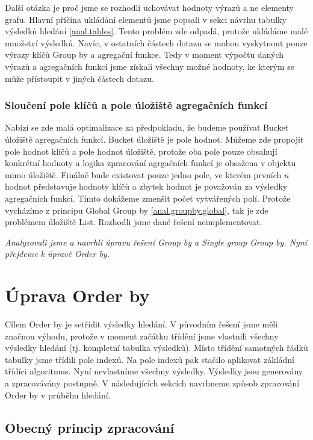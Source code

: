 Další otázka je proč jsme se rozhodli uchovávat hodnoty výrazů a ne elementy grafu.
Hlavní příčina ukládání elementů jsme popsali v sekci návrhu tabulky výsledků hledání \ref{anal.tables}.
Tento problém zde odpadá, protože ukládáme malé množství výsledků.
Navíc, v ostatních částech dotazu se mohou vyskytnout pouze výrazy klíčů Group by a agregační funkce.
Tedy v moment výpočtu daných výrazů a agregačních funkcí jsme získali všechny možné hodnoty, ke kterým se může přístoupit v jiných částech dotazu. 

\subsubsection{Sloučení pole klíčů a pole úložiště agregačních funkcí}

Nabízí se zde malá optimalizace za předpokladu, že budeme používat Bucket úložiště agregačních funkcí.
Bucket úložiště je pole hodnot.
Můžeme zde propojit pole hodnot klíčů a pole hodnot úložiště, protože oba pole pouze obsahují konkrétní hodnoty a logika zpracování agrgačních funkcí je obsažena v objektu mimo úložiště.
Finálně bude existovat pouze jedno pole, ve kterém prvních $n$ hodnot představuje hodnoty klíčů a zbytek hodnot je považován za výsledky agregačních funkcí.
Tímto dokážeme zmenšit počet vytvářených polí.
Protože vycházíme z principu Global Group by \ref{anal.groupby.global}, tak je zde problémem úložiště List.
Rozhodli jsme dané řešení neimplementovat.

\bigskip
\textit{Analyzovali jsme a navrhli úpravu řešení Group by a Single group Group by. 
Nyní přejdeme k úpravě Order by.}

\section{Úprava Order by}

Cílem Order by je setřídit výsledky hledání.
V původním řešení jsme měli značnou výhodu, protože v moment začátku třídění jsme vlastnili všechny výsledky hledání (tj. kompletní tabulka výsledků).
Místo třídění samotných řádků tabulky jsme třídili pole indexů.
Na pole indexů pak stačilo aplikovat zákládní třídíci algoritmus.
Nyní nevlastníme všechny výsledky.
Výsledky jsou generovány a zpracovávány postupně.
V následujících sekcích navrhneme způsob zpracování Order by v průběhu hledání.

\subsection{Obecný princip zpracování}

